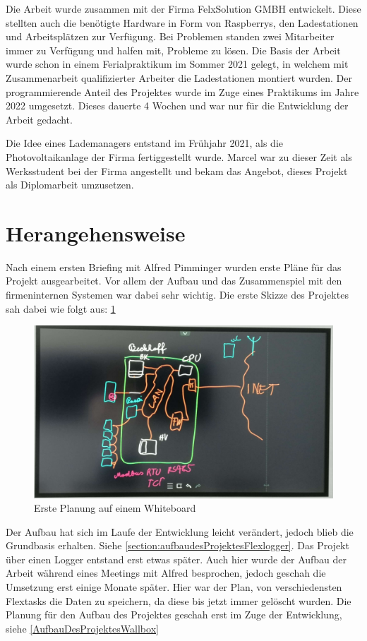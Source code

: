 Die Arbeit wurde zusammen mit der Firma FelxSolution GMBH entwickelt. Diese stellten auch die benötigte Hardware in Form von Raspberrys, den Ladestationen und Arbeitsplätzen zur Verfügung. Bei Problemen standen zwei Mitarbeiter immer zu Verfügung und halfen mit, Probleme zu lösen. Die Basis der Arbeit wurde schon in einem Ferialpraktikum im Sommer 2021 gelegt, in welchem mit Zusammenarbeit qualifizierter Arbeiter die Ladestationen montiert wurden. Der programmierende Anteil des Projektes wurde im Zuge eines Praktikums im Jahre 2022 umgesetzt. Dieses dauerte 4 Wochen und war nur für die Entwicklung der Arbeit gedacht.

Die Idee eines Lademanagers entstand im Frühjahr 2021, als die Photovoltaikanlage der Firma fertiggestellt wurde. Marcel war zu dieser Zeit als Werksstudent bei der Firma angestellt und bekam das Angebot, dieses Projekt als Diplomarbeit umzusetzen.

\section{Herangehensweise}

Nach einem ersten Briefing mit Alfred Pimminger wurden erste Pläne für das Projekt ausgearbeitet. Vor allem der Aufbau und das Zusammenspiel mit den firmeninternen Systemen war dabei sehr wichtig. Die erste Skizze des Projektes sah dabei wie folgt aus: 
\ref{fig:impl:ersteSkizze}

\begin{figure}[h t]
  \centering
  \includegraphics[scale=0.1]{pics/ersteSkizze.jpg}
  \caption{Erste Planung auf einem Whiteboard}
  \label{fig:impl:ersteSkizze}
\end{figure}
 

Der Aufbau hat sich im Laufe der Entwicklung leicht verändert, jedoch blieb die Grundbasis erhalten. Siehe \ref{section:aufbaudesProjektesFlexlogger}. Das Projekt über einen Logger entstand erst etwas später. Auch hier wurde der Aufbau der Arbeit während eines Meetings mit Alfred besprochen, jedoch geschah die Umsetzung erst einige Monate später. Hier war der Plan, von verschiedensten Flextasks die Daten zu speichern, da diese bis jetzt immer gelöscht wurden. Die Planung für den Aufbau des Projektes geschah erst im Zuge der Entwicklung, siehe \ref{AufbauDesProjektesWallbox} 
 
